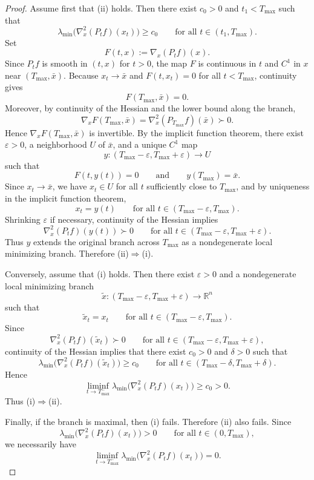 \documentclass{article}
\begin{document}
\begin{proof}
Assume first that (ii) holds. Then there exist $c_0>0$ and $t_1<T_{\max}$ such that
$$
\lambda_{\min}\bigl(\nabla_x^2(P_t f)(x_t)\bigr)\ge c_0
\qquad\text{for all }t\in(t_1,T_{\max}).
$$
Set
$$
F(t,x):=\nabla_x(P_t f)(x).
$$
Since $P_t f$ is smooth in $(t,x)$ for $t>0$, the map $F$ is continuous in $t$ and $C^1$ in $x$ near $(T_{\max},\bar x)$. Because $x_t\to\bar x$ and $F(t,x_t)=0$ for all $t<T_{\max}$, continuity gives
$$
F(T_{\max},\bar x)=0.
$$
Moreover, by continuity of the Hessian and the lower bound along the branch,
$$
\nabla_xF(T_{\max},\bar x)=\nabla_x^2(P_{T_{\max}}f)(\bar x)\succ 0.
$$
Hence $\nabla_xF(T_{\max},\bar x)$ is invertible. By the implicit function theorem, there exist $\varepsilon>0$, a neighborhood $U$ of $\bar x$, and a unique $C^1$ map
$$
y:(T_{\max}-\varepsilon,T_{\max}+\varepsilon)\to U
$$
such that
$$
F(t,y(t))=0
\qquad\text{and}\qquad
y(T_{\max})=\bar x.
$$
Since $x_t\to\bar x$, we have $x_t\in U$ for all $t$ sufficiently close to $T_{\max}$, and by uniqueness in the implicit function theorem,
$$
x_t=y(t)
\qquad\text{for all }t\in(T_{\max}-\varepsilon,T_{\max}).
$$
Shrinking $\varepsilon$ if necessary, continuity of the Hessian implies
$$
\nabla_x^2(P_t f)(y(t))\succ 0
\qquad\text{for all }t\in(T_{\max}-\varepsilon,T_{\max}+\varepsilon).
$$
Thus $y$ extends the original branch across $T_{\max}$ as a nondegenerate local minimizing branch. Therefore (ii)$\Rightarrow$(i).

Conversely, assume that (i) holds. Then there exist $\varepsilon>0$ and a nondegenerate local minimizing branch
$$
\widetilde x:(T_{\max}-\varepsilon,T_{\max}+\varepsilon)\to\mathbb R^n
$$
such that
$$
\widetilde x_t=x_t
\qquad\text{for all }t\in(T_{\max}-\varepsilon,T_{\max}).
$$
Since
$$
\nabla_x^2(P_t f)(\widetilde x_t)\succ 0
\qquad\text{for all }t\in(T_{\max}-\varepsilon,T_{\max}+\varepsilon),
$$
continuity of the Hessian implies that there exist $c_0>0$ and $\delta>0$ such that
$$
\lambda_{\min}\bigl(\nabla_x^2(P_t f)(\widetilde x_t)\bigr)\ge c_0
\qquad\text{for all }t\in(T_{\max}-\delta,T_{\max}+\delta).
$$
Hence
$$
\liminf_{t\to T_{\max}^-}\lambda_{\min}\bigl(\nabla_x^2(P_t f)(x_t)\bigr)\ge c_0>0.
$$
Thus (i)$\Rightarrow$(ii).

Finally, if the branch is maximal, then (i) fails. Therefore (ii) also fails. Since
$$
\lambda_{\min}\bigl(\nabla_x^2(P_t f)(x_t)\bigr)>0
\qquad\text{for all }t\in(0,T_{\max}),
$$
we necessarily have
$$
\liminf_{t\to T_{\max}^-}\lambda_{\min}\bigl(\nabla_x^2(P_t f)(x_t)\bigr)=0.
$$
\end{proof}
\end{document}
